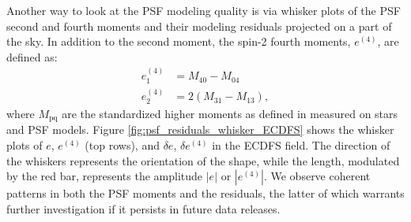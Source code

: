 Another way to look at the \gls{PSF} modeling quality is via whisker plots of the \gls{PSF} second and fourth moments and their modeling residuals projected on a part of the sky.
In addition to the second moment, the spin-2 fourth moments, $e^{(4)}$, are defined as:
\begin{align*}
e^{(4)}_1 &= M_{\text{40}} - M_{\text{04}} \\
e^{(4)}_2 &= 2\left(M_{\text{31}} - M_{\text{13}}\right),
\end{align*}
where $M_{\text{pq}}$ are the standardized higher moments as defined in \cite{2023MNRAS.520.2328Z} measured on stars and PSF models.
Figure \ref{fig:psf_residuals_whisker_ECDFS} shows
the whisker plots of $e$, $e^{(4)}$ (top rows), and $\delta e$, $\delta e^{(4)}$
in the \gls{ECDFS} field. The direction of the whiskers represents the orientation of the \gls{shape}, while the length, modulated by the red bar, represents the amplitude $|e|$ or $|e^{(4)}|$.
We observe coherent patterns in both the \gls{PSF} moments and the residuals, the latter of which warrants further investigation if it persists in future data releases.
